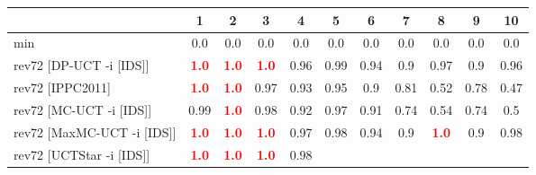\documentclass{article}
\begin{document}
\begin{tabular}{|l|r@{$\pm$}rr@{$\pm$}rr@{$\pm$}rr@{$\pm$}rr@{$\pm$}rr@{$\pm$}rr@{$\pm$}rr@{$\pm$}rr@{$\pm$}rr@{$\pm$}r|}
\hline

& \multicolumn{2}{c}{1}
& \multicolumn{2}{c}{2}
& \multicolumn{2}{c}{3}
& \multicolumn{2}{c}{4}
& \multicolumn{2}{c}{5}
& \multicolumn{2}{c}{6}
& \multicolumn{2}{c}{7}
& \multicolumn{2}{c}{8}
& \multicolumn{2}{c}{9}
& \multicolumn{2}{c|}{10}
\\
\hline
\hline
min
& \multicolumn{2}{c}{0.0}
& \multicolumn{2}{c}{0.0}
& \multicolumn{2}{c}{0.0}
& \multicolumn{2}{c}{0.0}
& \multicolumn{2}{c}{0.0}
& \multicolumn{2}{c}{0.0}
& \multicolumn{2}{c}{0.0}
& \multicolumn{2}{c}{0.0}
& \multicolumn{2}{c}{0.0}
& \multicolumn{2}{c|}{0.0}
\\
rev72 [DP-UCT -i [IDS]]
& \multicolumn{2}{c}{\textbf{\textcolor{red}{1.0}}}
& \multicolumn{2}{c}{\textbf{\textcolor{red}{1.0}}}
& \multicolumn{2}{c}{\textbf{\textcolor{red}{1.0}}}
& \multicolumn{2}{c}{0.96}
& \multicolumn{2}{c}{0.99}
& \multicolumn{2}{c}{0.94}
& \multicolumn{2}{c}{0.9}
& \multicolumn{2}{c}{0.97}
& \multicolumn{2}{c}{0.9}
& \multicolumn{2}{c|}{0.96}
\\
rev72 [IPPC2011]
& \multicolumn{2}{c}{\textbf{\textcolor{red}{1.0}}}
& \multicolumn{2}{c}{\textbf{\textcolor{red}{1.0}}}
& \multicolumn{2}{c}{0.97}
& \multicolumn{2}{c}{0.93}
& \multicolumn{2}{c}{0.95}
& \multicolumn{2}{c}{0.9}
& \multicolumn{2}{c}{0.81}
& \multicolumn{2}{c}{0.52}
& \multicolumn{2}{c}{0.78}
& \multicolumn{2}{c|}{0.47}
\\
rev72 [MC-UCT -i [IDS]]
& \multicolumn{2}{c}{0.99}
& \multicolumn{2}{c}{\textbf{\textcolor{red}{1.0}}}
& \multicolumn{2}{c}{0.98}
& \multicolumn{2}{c}{0.92}
& \multicolumn{2}{c}{0.97}
& \multicolumn{2}{c}{0.91}
& \multicolumn{2}{c}{0.74}
& \multicolumn{2}{c}{0.54}
& \multicolumn{2}{c}{0.74}
& \multicolumn{2}{c|}{0.5}
\\
rev72 [MaxMC-UCT -i [IDS]]
& \multicolumn{2}{c}{\textbf{\textcolor{red}{1.0}}}
& \multicolumn{2}{c}{\textbf{\textcolor{red}{1.0}}}
& \multicolumn{2}{c}{\textbf{\textcolor{red}{1.0}}}
& \multicolumn{2}{c}{0.97}
& \multicolumn{2}{c}{0.98}
& \multicolumn{2}{c}{0.94}
& \multicolumn{2}{c}{0.9}
& \multicolumn{2}{c}{\textbf{\textcolor{red}{1.0}}}
& \multicolumn{2}{c}{0.9}
& \multicolumn{2}{c|}{0.98}
\\
rev72 [UCTStar -i [IDS]]
& \multicolumn{2}{c}{\textbf{\textcolor{red}{1.0}}}
& \multicolumn{2}{c}{\textbf{\textcolor{red}{1.0}}}
& \multicolumn{2}{c}{\textbf{\textcolor{red}{1.0}}}
& \multicolumn{2}{c}{0.98}

\end{tabular}
\end{document}
